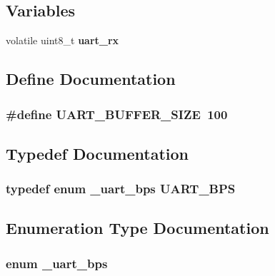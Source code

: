 \subsection*{Variables}
\begin{CompactItemize}
\item 
volatile uint8\_\-t {\bf uart\_\-rx}
\end{CompactItemize}


\subsection{Define Documentation}
\subsubsection{\setlength{\rightskip}{0pt plus 5cm}\#define UART\_\-BUFFER\_\-SIZE~100}\label{uart_8h_0d57378e32bf8278011460740bc29f7f}




\subsection{Typedef Documentation}
\subsubsection{\setlength{\rightskip}{0pt plus 5cm}typedef enum {\bf \_\-uart\_\-bps}  {\bf UART\_\-BPS}}\label{uart_8h_33ae12cb2f56f786a3f8d879df63b035}




\subsection{Enumeration Type Documentation}
\subsubsection{\setlength{\rightskip}{0pt plus 5cm}enum {\bf \_\-uart\_\-bps}}\label{uart_8h_463885c313c1904a4fa0612ffd313853}


